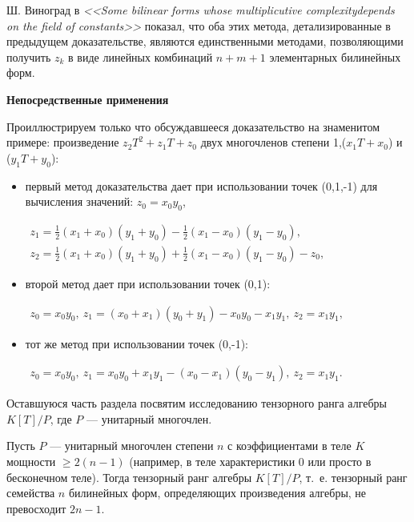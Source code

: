 \documentclass{mai_book}
\renewcommand{\ge}{\geqslant}
\begin{document}
Ш. Виноград в \textit{<<Some bilinear forms whose multiplicutive complexity\linebreak depends on the field of constants>>} показал, что оба этих метода, детализированные в предыдущем доказательстве, являются единственными методами, позволяющими получить $z_k$ в виде линейных комбинаций $n+m+1$ элементарных билинейных форм.
\begin{beznomera}
  \textbf{Непосредственные применения}
  \end{beznomera}
Проиллюстрируем только что обсуждавшееся доказательство на знаменитом примере: произведение $z_2T^2+z_1T+z_0$ двух многочленов степени 1,($x_1T+x_0$) и ($y_1T+y_0$):
\begin{itemize}
\item{первый метод доказательства дает при использовании точек (0,1,-1) для вычисления значений: $z_0=x_0y_0$,
  \begin{center}
    $
    \begin{array}{l}
  z_1=\frac{1}{2}(x_1+x_0)(y_1+y_0)-\frac{1}{2}(x_1-x_0)(y_1-y_0), \\
  z_2=\frac{1}{2}(x_1+x_0)(y_1+y_0)+\frac{1}{2}(x_1-x_0)(y_1-y_0)-z_0,
\end{array}
  $
  \end{center}
  }
\item{второй метод дает при использовании точек (0,1):
  \begin{center}
    $
    \begin{array}{l}
    z_0=x_0y_0,\ z_1=(x_0+x_1)(y_0+y_1)-x_0y_0-x_1y_1,\ z_2=x_1y_1,
    \end{array}
    $
\end{center}}
\item{тот же метод при использовании точек (0,-1):
  \begin{center}
    $
    \begin{array}{l}
      z_0=x_0y_0,\ z_1=x_0y_0+x_1y_1-(x_0-x_1)(y_0-y_1),\ z_2=x_1y_1.
    \end{array}
    $
\end{center}}
\end{itemize}\par
Оставшуюся часть раздела посвятим исследованию тензорного ранга алгебры $K[T]/P$, где $P$ --- унитарный многочлен.
\begin{property}
  Пусть $P$ --- унитарный многочлен степени $n$ с коэффициентами в теле $K$ мощности $\ge2(n-1)$ (например, в теле характеристики 0 или просто в бесконечном теле). Тогда тензорный ранг алгебры $K[T]/P$, т.~е. тензорный ранг семейства $n$ билинейных форм, определяющих произведения алгебры, не превосходит $2n-1$.
  \end{property}
\end{document}
